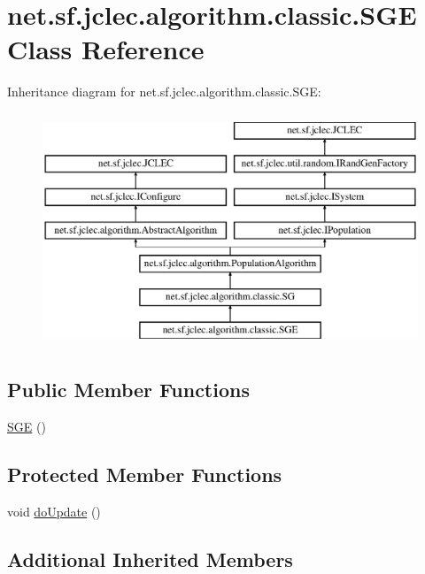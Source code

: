 \hypertarget{classnet_1_1sf_1_1jclec_1_1algorithm_1_1classic_1_1_s_g_e}{\section{net.\-sf.\-jclec.\-algorithm.\-classic.\-S\-G\-E Class Reference}
\label{classnet_1_1sf_1_1jclec_1_1algorithm_1_1classic_1_1_s_g_e}
}
Inheritance diagram for net.\-sf.\-jclec.\-algorithm.\-classic.\-S\-G\-E\-:\begin{figure}[H]
\begin{center}
\leavevmode
\includegraphics[height=7.000000cm]{classnet_1_1sf_1_1jclec_1_1algorithm_1_1classic_1_1_s_g_e}
\end{center}
\end{figure}
\subsection*{Public Member Functions}
\begin{DoxyCompactItemize}
\item 
\hyperlink{classnet_1_1sf_1_1jclec_1_1algorithm_1_1classic_1_1_s_g_e_a28c3e6c873517e1e5434189e8ed121c1}{S\-G\-E} ()
\end{DoxyCompactItemize}
\subsection*{Protected Member Functions}
\begin{DoxyCompactItemize}
\item 
void \hyperlink{classnet_1_1sf_1_1jclec_1_1algorithm_1_1classic_1_1_s_g_e_aebb085e840dec66bee4f48d04ae7efd4}{do\-Update} ()
\end{DoxyCompactItemize}
\subsection*{Additional Inherited Members}


